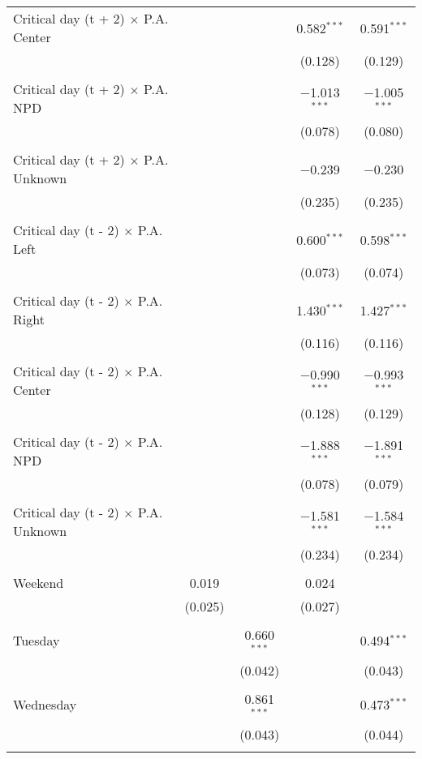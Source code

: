 \documentclass[
]{article}
\begin{document}
\begin{table}[!htbp]
{\begin{tabular}{@{\extracolsep{5pt}}lcccc}
 Critical day (t + 2) $\times$ P.A. Center &  &  & 0.582$^{***}$ & 0.591$^{***}$ \\ 
  &  &  & (0.128) & (0.129) \\ 
  & & & & \\ 
 Critical day (t + 2) $\times$ P.A. NPD &  &  & $-$1.013$^{***}$ & $-$1.005$^{***}$ \\ 
  &  &  & (0.078) & (0.080) \\ 
  & & & & \\ 
 Critical day (t + 2) $\times$ P.A. Unknown &  &  & $-$0.239 & $-$0.230 \\ 
  &  &  & (0.235) & (0.235) \\ 
  & & & & \\ 
 Critical day (t - 2) $\times$ P.A. Left &  &  & 0.600$^{***}$ & 0.598$^{***}$ \\ 
  &  &  & (0.073) & (0.074) \\ 
  & & & & \\ 
 Critical day (t - 2) $\times$ P.A. Right &  &  & 1.430$^{***}$ & 1.427$^{***}$ \\ 
  &  &  & (0.116) & (0.116) \\ 
  & & & & \\ 
 Critical day (t - 2) $\times$ P.A. Center &  &  & $-$0.990$^{***}$ & $-$0.993$^{***}$ \\ 
  &  &  & (0.128) & (0.129) \\ 
  & & & & \\ 
 Critical day (t - 2) $\times$ P.A. NPD &  &  & $-$1.888$^{***}$ & $-$1.891$^{***}$ \\ 
  &  &  & (0.078) & (0.079) \\ 
  & & & & \\ 
 Critical day (t - 2) $\times$ P.A. Unknown &  &  & $-$1.581$^{***}$ & $-$1.584$^{***}$ \\ 
  &  &  & (0.234) & (0.234) \\ 
  & & & & \\ 
 Weekend & 0.019 &  & 0.024 &  \\ 
  & (0.025) &  & (0.027) &  \\ 
  & & & & \\ 
 Tuesday &  & 0.660$^{***}$ &  & 0.494$^{***}$ \\ 
  &  & (0.042) &  & (0.043) \\ 
  & & & & \\ 
 Wednesday &  & 0.861$^{***}$ &  & 0.473$^{***}$ \\ 
  &  & (0.043) &  & (0.044) \\ 
  & & & & \\ 

\end{tabular}}
\end{table}
\end{document}

